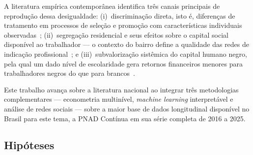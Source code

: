 \documentclass[12pt, a4paper, oneside]{article}
\begin{document}
A literatura empírica contemporânea identifica três canais principais de
reprodução dessa desigualdade: (i)~discriminação direta, isto é, diferenças
de tratamento em processos de seleção e promoção com características
individuais observadas~\cite{pager2007}; (ii)~segregação residencial e
seus efeitos sobre o capital social disponível ao trabalhador
--- o contexto do bairro define a qualidade das redes de indicação
profissional~\cite{wilson1987, sampson1997}; e (iii)~subvalorização
sistêmica do capital humano negro, pela qual um dado nível de escolaridade
gera retornos financeiros menores para trabalhadores negros do que para
brancos~\cite{hasenbalg1979, pager2007}.

Este trabalho avança sobre a literatura nacional ao integrar três
metodologias complementares --- econometria multinível, \textit{machine learning}
interpretável e análise de redes sociais --- sobre a maior base de dados
longitudinal disponível no Brasil para este tema, a PNAD Contínua em sua
série completa de 2016 a 2025.

\subsection{Hipóteses}
\label{subsec:hipoteses}
\end{document}
